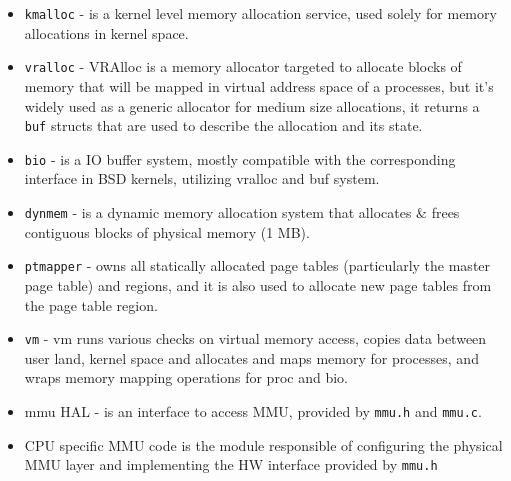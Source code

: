 \begin{itemize}
  \item \verb+kmalloc+  - is a kernel level memory allocation service, used
                        solely for memory allocations in kernel space.
  \item \verb+vralloc+  - VRAlloc is a memory allocator targeted to allocate
                        blocks of memory that will be mapped in virtual
                        address space of a processes, but it's widely used
                        as a generic allocator for medium size allocations,
                        it returns a \verb+buf+ structs that are used to
                        describe the allocation and its state.
  \item \verb+bio+      - is a IO buffer system, mostly compatible with the
                        corresponding interface in BSD kernels,
                        utilizing vralloc and buf system.
  \item \verb+dynmem+   - is a dynamic memory allocation system that allocates
                        \& frees contiguous blocks of physical memory (1 MB).
  \item \verb+ptmapper+ - owns all statically allocated page tables
                        (particularly the master page table) and regions,
                        and it is also used to allocate new page tables from
                        the page table region.
  \item \verb+vm+       - vm runs various checks on virtual memory access,
                        copies data between user land, kernel space and
                        allocates and maps memory for processes, and wraps
                        memory mapping operations for proc and \acs{bio}.
  \item mmu HAL -       is an interface to access MMU, provided by \verb+mmu.h+
                        and \verb+mmu.c+.
  \item CPU specific MMU code is the module responsible of configuring the
        physical MMU layer and implementing the HW interface provided by
        \verb+mmu.h+
\end{itemize}

